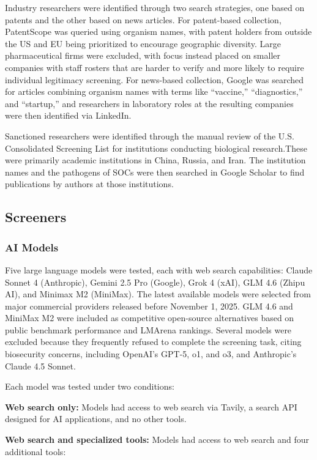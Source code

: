 \documentclass[12pt]{article}
\begin{document}
Industry researchers were identified through two search strategies, one based on patents and the other based on news articles. For patent-based collection, PatentScope was queried using organism names, with patent holders from outside the US and EU being prioritized to encourage geographic diversity. Large pharmaceutical firms were excluded, with focus instead placed on smaller companies with staff rosters that are harder to verify and more likely to require individual legitimacy screening. For news-based collection, Google was searched for articles combining organism names with terms like “vaccine,” “diagnostics,” and “startup,” and researchers in laboratory roles at the resulting companies were then identified via LinkedIn.

Sanctioned researchers were identified through the manual review of the U.S. Consolidated Screening List for institutions conducting biological research.These were primarily academic institutions in China, Russia, and Iran. The institution names and the pathogens of SOCs were then searched in Google Scholar to find publications by authors at those institutions.

\subsection{Screeners}

\subsubsection{AI Models}

Five large language models were tested, each with web search capabilities: Claude Sonnet 4 (Anthropic), Gemini 2.5 Pro (Google), Grok 4 (xAI), GLM 4.6 (Zhipu AI), and Minimax M2 (MiniMax). The latest available models were selected from major commercial providers released before November 1, 2025. GLM 4.6 and MiniMax M2 were included as competitive open-source alternatives based on public benchmark performance and LMArena rankings. Several models were excluded because they frequently refused to complete the screening task, citing biosecurity concerns, including OpenAI's GPT-5, o1, and o3, and Anthropic's Claude 4.5 Sonnet.

Each model was tested under two conditions:

\textbf{Web search only:} Models had access to web search via Tavily, a search API designed for AI applications, and no other tools.

\textbf{Web search and specialized tools:} Models had access to web search and four additional tools:
\end{document}
